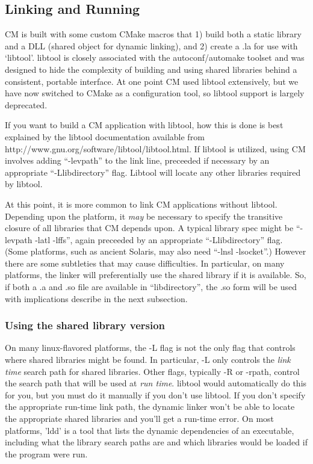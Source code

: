 \documentclass[11pt]{article}
\begin{document}
\subsection{Linking and Running}
CM is built with some custom CMake macros that 1) build both a static
library and a DLL (shared object for dynamic linking), and 2) create a .la
for use with `libtool'.  libtool is closely associated with the
autoconf/automake toolset and was designed to hide the complexity of building
and using shared libraries behind a consistent, portable interface. At one
point CM used libtool extensively, but we have now switched to CMake as a
configuration tool, so libtool support is largely deprecated.

If you want to build a CM application with libtool, how this is done is best
explained by the libtool documentation available from
http://www.gnu.org/software/libtool/libtool.html.  If libtool is utilized,
using CM involves adding ``-levpath'' to the link  line, preceeded if necessary
by an appropriate ``-Llibdirectory'' flag.  Libtool will locate any other
libraries required by libtool.  

At this point, it is more common to link CM applications without
libtool. Depending upon the platform, it {\it may} be necessary to specify
the transitive closure of all libraries that CM depends upon. A
typical library spec might be ``-levpath -latl -lffs'', again preceeded by an
appropriate ``-Llibdirectory'' flag.  (Some platforms, such as ancient
Solaris, may also need ``-lnsl -lsocket''.)
However there are some subtleties that
may cause difficulties. In particular, on many platforms, the linker will
preferentially use the shared library if it is available. So, if both a .a
and .so file are available in ``libdirectory'', the .so form will be used
with implications describe in the next subsection.

\subsubsection{Using the shared library version}
On many linux-flavored platforms, the -L flag is not the only flag that
controls where shared libraries might be found. In particular, -L only
controls the {\it link time} search path for shared libraries. Other flags,
typically -R or -rpath, control the search path that will be used at {\it run time}.
libtool would automatically do this for you, but you must do it manually
if you don't use libtool. If you don't specify the appropriate run-time
link path, the dynamic linker won't be able to locate the appropriate shared
libraries and you'll get a run-time error. On most platforms, 'ldd' is
a tool that lists the dynamic dependencies of an executable, including
what the library search paths are and which libraries would be loaded if
the program were run.
\end{document}
